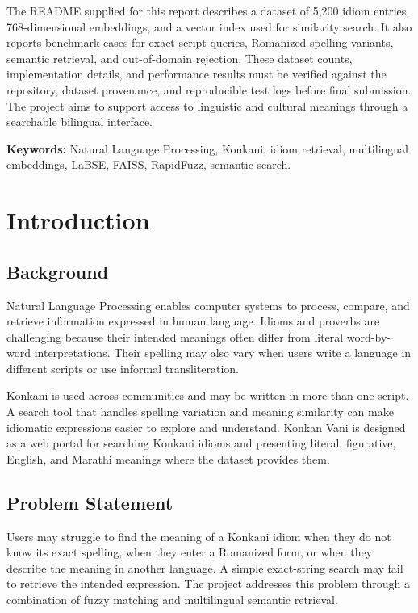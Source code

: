 \documentclass[12pt,a4paper]{report}
\begin{document}
The README supplied for this report describes a dataset of 5,200 idiom entries,
768-dimensional embeddings, and a vector index used for similarity search. It also
reports benchmark cases for exact-script queries, Romanized spelling variants,
semantic retrieval, and out-of-domain rejection. These dataset counts,
implementation details, and performance results must be verified against the
repository, dataset provenance, and reproducible test logs before final
submission. The project aims to support access to linguistic and cultural
meanings through a searchable bilingual interface.

\vspace{0.5cm}
\noindent \textbf{Keywords:} Natural Language Processing, Konkani, idiom
retrieval, multilingual embeddings, LaBSE, FAISS, RapidFuzz, semantic search.
\clearpage

\tableofcontents
\listoffigures
\listoftables
\clearpage


\chapter{Introduction}

\section{Background}
Natural Language Processing enables computer systems to process, compare, and
retrieve information expressed in human language. Idioms and proverbs are
challenging because their intended meanings often differ from literal word-by-word
interpretations. Their spelling may also vary when users write a language in
different scripts or use informal transliteration.

Konkani is used across communities and may be written in more than one script. A
search tool that handles spelling variation and meaning similarity can make
idiomatic expressions easier to explore and understand. Konkan Vani is designed as
a web portal for searching Konkani idioms and presenting literal, figurative,
English, and Marathi meanings where the dataset provides them.

\section{Problem Statement}
Users may struggle to find the meaning of a Konkani idiom when they do not know
its exact spelling, when they enter a Romanized form, or when they describe the
meaning in another language. A simple exact-string search may fail to retrieve the
intended expression. The project addresses this problem through a combination of
fuzzy matching and multilingual semantic retrieval.
\end{document}
